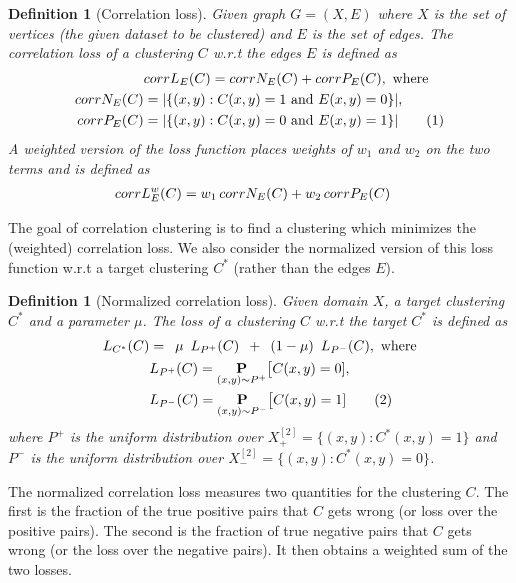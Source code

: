 \documentclass[12pt]{article}
\newtheorem{definition}[theorem]{Definition}
\newcommand{\mb}{\mathbf}
\newcommand\numberthis{\addtocounter{equation}{1}\tag{\theequation}}
\begin{document}
\begin{definition}[Correlation loss\cite{bansal2004correlation}]
\label{defn:correlationLoss}
Given graph $G = (X, E)$ where $X$ is the set of vertices (the given dataset to be clustered) and $E$ is the set of edges. The correlation loss of a clustering $C$ w.r.t the edges $E$ is defined as \begin{align*}
  &corrL_{E}(C) = corrN_{E}(C) + corrP_{E}(C), \text{ where}\\
  corrN_{E}(C) &= |\{(x, y): C(x, y) = 1 \text{ and } E(x, y) = 0\}|,\\ 
  corrP_{E}(C) &= |\{(x, y): C(x, y) = 0 \text{ and } E(x, y) = 1\}| \numberthis\label{eqn:correlationLoss}
\end{align*}
A weighted version of the loss function places weights of $w_1$ and $w_2$ on the two terms and is defined as 
\begin{align}
  &corrL_{E}^{w}(C) = w_1 \thinspace corrN_{E}(C) + w_2 \thinspace corrP_{E}(C)\label{eqn:weightedCorrelationLoss}
\end{align}
\end{definition}

The goal of correlation clustering is to find a clustering which minimizes the (weighted) correlation loss. We also consider the normalized version of this loss function w.r.t a target clustering $C^*$ (rather than the edges $E$).

\begin{definition}[Normalized correlation loss]
\label{defn:normalizedCorrelationLoss}
Given domain $X$, a target clustering $C^*$ and a parameter $\mu$. The loss of a clustering $C$ w.r.t the target $C^*$ is defined as
\begin{align*}
  L_{C^*}(C) &= \enspace  \mu \enspace L_{P^+}(C) \enspace+\enspace (1-\mu) \enspace L_{P^-}(C), \text{ where} \\
  &L_{P^+}(C) = \underset{(x, y) \sim P^+}{\mb P} \big[ C(x, y) = 0 ],\\
  & L_{P^-}(C) = \underset{(x, y) \sim P^-}{\mb P} \big[ C(x, y) = 1] \numberthis\label{eqn:RCCV2}
\end{align*}
where $P^+$ is the uniform distribution over $X^{[2]}_+ = \{(x, y) : C^*(x, y) = 1\}$ and $P^-$ is the uniform distribution over $X^{[2]}_- = \{(x, y): C^*(x, y) = 0\}$. 
\end{definition}
The normalized correlation loss measures two quantities for the clustering $C$. The first is the fraction of the true positive pairs that $C$ gets wrong (or loss over the positive pairs). The second is the fraction of true negative pairs that $C$ gets wrong (or the loss over the negative pairs). It then obtains a weighted sum of the two losses. 
  
\end{document}
